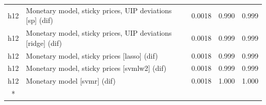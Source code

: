 \begin{ThreePartTable}
\begin{longtable}[t]{cp{5.5cm}ccc}
h12 & \raggedright Monetary model, sticky prices, UIP deviations [sp] (dif) & 0.0018 & 0.990 & 0.999\\
h12 & \raggedright Monetary model, sticky prices, UIP deviations [ridge] (dif) & 0.0018 & 0.999 & 0.999\\
h12 & \raggedright Monetary model, sticky prices [lasso] (dif) & 0.0018 & 0.999 & 0.999\\
h12 & \raggedright Monetary model, sticky prices [svmlw2] (dif) & 0.0018 & 0.999 & 0.999\\
h12 & \raggedright Monetary model [svmr] (dif) & 0.0018 & 1.000 & 1.000\\*
\end{longtable}
\end{ThreePartTable}
\endgroup{}
